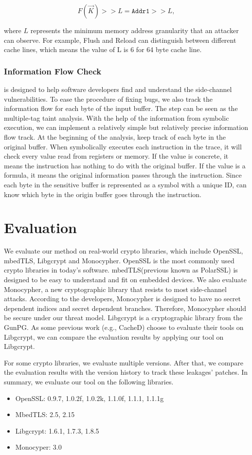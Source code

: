 $$F(\vec{K}) >> L = \mathtt{Addr1} >> L,$$

\noindent where $L$ represents the minimum memory address granularity that an attacker can observe. For example, Flush and Reload can distinguish between different cache lines, which means the value of L is 6 for 64 byte cache line.

\subsubsection{Information Flow Check}
\detect{} is designed to help software developers find and understand the side-channel vulnerabilities. To ease the procedure of fixing bugs, we also track the information flow for each byte of the input
buffer.
The step can be seen as the multiple-tag taint analysis. With the help of the information from symbolic execution, we can implement a relatively simple but relatively precise information flow track.
At the beginning of the analysis, \detect{} keep track of each byte in
the original buffer. When \detect{} symbolically executes each instruction in the trace, it will check every value read from registers or memory. If the value is concrete, it means the instruction has nothing to do with the original buffer.
If the value is a formula, it means the original information passes through the instruction. Since each byte in the sensitive buffer is represented as a symbol with a unique ID, \detect{} can know which byte in the origin buffer goes through the instruction.

\section{Evaluation}
We evaluate our method on real-world crypto libraries, which include  OpenSSL, mbedTLS, Libgcrypt and Monocypher\@. OpenSSL is the most commonly used crypto libraries in today's software. mbedTLS\@ (previous known as PolarSSL) is designed to be easy to understand and fit on embedded devices. We also evaluate Monocypher, a new cryptographic library that resists to most side-channel attacks.
According to the developers, Monocypher is designed to have no secret dependent indices and secret dependent branches. Therefore, Monocypher should be secure under our threat model. Libgcrypt is a cryptographic library from the GunPG. As some previous work (e.g., CacheD) choose to evaluate their tools on Libgcrypt, we can compare the evaluation results by applying our tool on Libgcrypt.

For some crypto libraries, we evaluate multiple versions. After that, we compare the evaluation results with the version history to track these leakages' patches. In summary, we evaluate our tool on the following libraries.
\begin{itemize}
  \item OpenSSL: 0.9.7, 1.0.2f, 1.0.2k, 1.1.0f, 1.1.1, 1.1.1g
  \item MbedTLS: 2.5, 2.15
  \item Libgcrypt: 1.6.1, 1.7.3, 1.8.5
  \item Monocyper: 3.0
\end{itemize}

